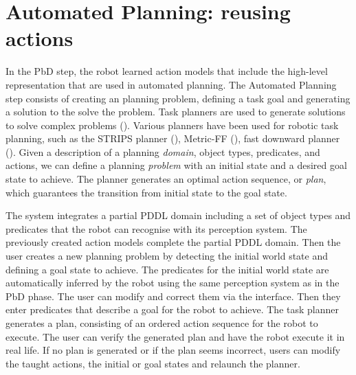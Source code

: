 


\section{Automated Planning: reusing actions}\label{sec:AP}
In the PbD step, the robot learned action models that include the high-level representation that are used in automated planning. 
The Automated Planning step consists of creating an planning problem, defining a task goal and generating a solution to the solve the problem.
Task planners are used to generate solutions to solve complex problems ().
Various planners have been used for robotic task planning, such as the STRIPS planner (\cite{she2014teaching}), Metric-FF (\cite{cubek2015high}), fast downward planner (\cite{abdo2013learning}). 
Given a description of a planning \textit{domain}, \ie object types, predicates, and actions, we can define a planning \textit{problem} with an initial state and a desired goal state to achieve. 
The planner generates an optimal action sequence, or \textit{plan}, which guarantees the transition from initial state to the goal state. 

The system integrates a partial PDDL domain including a set of object types and predicates that the robot can recognise with its perception system.
The previously created action models complete the partial PDDL domain.
Then the user creates a new planning problem by detecting the initial world state and defining a goal state to achieve.
The predicates for the initial world state are automatically inferred by the robot using the same perception system as in the PbD phase.
The user can modify and correct them via the interface. 
Then they enter predicates that describe a goal for the robot to achieve.
The task planner generates a plan, consisting of an ordered action sequence for the robot to execute. 
The user can verify the generated plan and have the robot execute it in real life.
If no plan is generated or if the plan seems incorrect, users can modify the taught actions, the initial or goal states and relaunch the planner.

